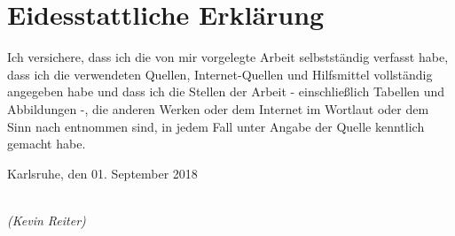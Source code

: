 \section*{Eidesstattliche Erklärung}
\begin{large}

Ich versichere, dass ich die von mir vorgelegte Arbeit selbstständig verfasst habe, dass ich die verwendeten Quellen, Internet-Quellen und Hilfsmittel vollständig angegeben habe und dass ich die Stellen der Arbeit - einschließlich Tabellen und Abbildungen -, die anderen Werken oder dem Internet im Wortlaut oder dem Sinn nach entnommen sind, in jedem Fall unter Angabe der Quelle kenntlich gemacht habe.\vspace{2cm}

\noindent
Karlsruhe, den 01. September 2018

\vspace{3cm}

\hspace*{6cm}%
\dotfill\\
\hspace*{7cm}%
\textit{(Kevin Reiter)}

\end{large}
